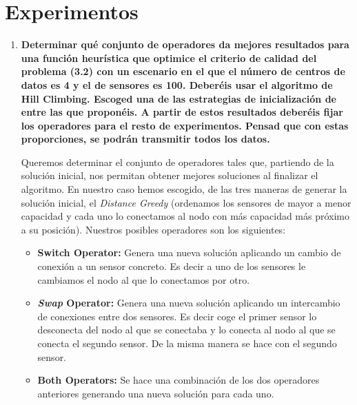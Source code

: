 \documentclass{article}
\begin{document}
\section{Experimentos}
\begin{enumerate}
  \item \textbf{Determinar qué conjunto de operadores da mejores resultados para una función heurística que optimice el criterio de calidad del problema (3.2) con un escenario en el que el número de centros de datos es 4 y el de sensores es 100. Deberéis usar el algoritmo de Hill Climbing. Escoged una de las estrategias de inicialización de entre las que proponéis. A partir de estos resultados deberéis fijar los operadores para el resto de experimentos. Pensad que con estas proporciones, se podrán transmitir todos los datos.}

  Queremos determinar el conjunto de operadores tales que, partiendo de la solución inicial, nos permitan obtener mejores soluciones al finalizar el algoritmo. En nuestro caso hemos escogido, de las tres maneras de generar la solución inicial, el \textit{Distance Greedy} (ordenamos los sensores de mayor a menor capacidad y cada uno lo conectamos al nodo con más capacidad más próximo a su posición).
  Nuestros posibles operadores son los siguientes:

  \begin{itemize}
    \item \textbf{Switch Operator:} Genera una nueva solución aplicando un cambio de conexión a un sensor concreto. Es decir a uno de los sensores le cambiamos el nodo al que lo conectamos por otro.
    \item \textbf{\textit{Swap} Operator:} Genera una nueva solución aplicando un intercambio de conexiones entre dos sensores. Es decir coge el primer sensor lo desconecta del nodo al que se conectaba y lo conecta al nodo al que se conecta el segundo sensor. De la misma manera se hace con el segundo sensor.
    \item \textbf {Both Operators:} Se hace una combinación de los dos operadores anteriores generando una nueva solución para cada uno.
  \end{itemize}


\end{enumerate}
\end{document}
